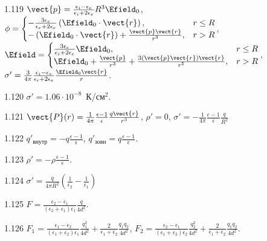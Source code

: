 \begin{Solution}{1.{119}}
	$\vect{p} = \frac{\epsilon_i - \epsilon_e}{\epsilon_i + 2\epsilon_e}R^3\Efield_0$,
	$
		\phi =
		\begin{cases}
			-\frac{3\epsilon_e}{\epsilon_e + 2\epsilon_e}\left( \Efield_0\cdot \vect{r}\right), & r \le R \\
			-\left( \Efield_0\cdot \vect{r}\right) + \frac{\vect{p} \vect{r}}{r^3},             & r > R
		\end{cases}
	$,\\
	$
		\Efield =
		\begin{cases}
			\frac{3\epsilon_e}{\epsilon_i + 2\epsilon_e} \Efield_0,                                 & r \le R \\
			\Efield_0 + \frac{\vect{p}}{r^3} + \frac{3\left(\vect{p}\vect{r}\right)\vect{r} }{r^5}, & r > R
		\end{cases}
	$,
	$\sigma' = \frac{3}{4\pi} \frac{\epsilon_i - \epsilon_e}{\epsilon_i + 2\epsilon_e} \frac{\Efield_0\vect{r}}{r}$.
\end{Solution}
\begin{Solution}{1.{120}}
	$\sigma' = 1.06\cdot10^{-8}$~К/см$^2$.
\end{Solution}
\begin{Solution}{1.{121}}
	$\vect{P}(r) = \frac{1}{4\pi}\frac{\epsilon -1 }{\epsilon}\frac{q\vect{r}}{r^3}$,
	$\rho'=0$,
	$\sigma'=  - \frac{1}{4\pi}\frac{\epsilon -1 }{\epsilon}\frac{q}{R^2}$
\end{Solution}
\begin{Solution}{1.{122}}
		$q'_\text{внутр} = -q\frac{\epsilon - 1}{\epsilon}$, 	$q'_\text{зовн} = q\frac{\epsilon - 1}{\epsilon}$.
	
\end{Solution}
\begin{Solution}{1.{123}}
		$\rho' = -\rho \frac{\epsilon - 1}{\epsilon}$.
	
\end{Solution}
\begin{Solution}{1.{124}}
	$\sigma' = \frac{q}{4\pi R^2}\left( \frac{1}{\epsilon_2} - \frac{1}{\epsilon_1} \right) $
\end{Solution}
\begin{Solution}{1.{125}}
	$F = \frac{\epsilon_2 - \epsilon_1}{(\epsilon_2 + \epsilon_1)\epsilon_1} \frac{q}{4d^2}$.
\end{Solution}
\begin{Solution}{1.{126}}
	$F_1 = \frac{\epsilon_1 - \epsilon_2}{(\epsilon_1 + \epsilon_2)\epsilon_1} \frac{q_1^2}{4d^2} + \frac{2}{\epsilon_1 + \epsilon_2} \frac{q_1q_2}{4d^2}$,
	$F_2 = \frac{\epsilon_2 - \epsilon_1}{(\epsilon_1 + \epsilon_2)\epsilon_2} \frac{q_2^2}{4d^2} + \frac{2}{\epsilon_1 + \epsilon_2} \frac{q_1q_2}{4d^2}$.
\end{Solution}
